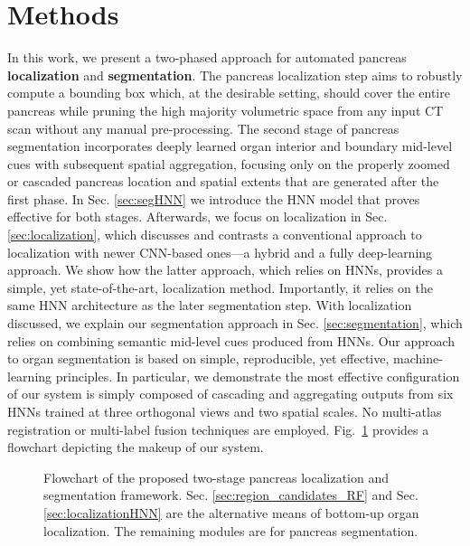 \documentclass[journal]{IEEEtran}
\begin{document}
\section{Methods}\label{sec:methods}
In this work, we present a two-phased approach for automated pancreas \textbf{localization} and \textbf{segmentation}. The pancreas localization step aims to robustly compute a bounding box which, at the desirable setting, should cover the entire pancreas while pruning the high majority volumetric space from any input CT scan without any manual pre-processing. The second stage of pancreas segmentation incorporates deeply learned organ interior and boundary mid-level cues with subsequent spatial aggregation, focusing only on the properly zoomed or cascaded pancreas location and spatial extents that are generated after the first phase. 
In Sec. \ref{sec:segHNN} we introduce the HNN model that proves effective for both stages. Afterwards, we focus on localization in Sec. \ref{sec:localization}, which discusses and contrasts a conventional approach to localization with newer CNN-based ones---a hybrid and a fully deep-learning approach. We show how the latter approach, which relies on HNNs, provides a simple, yet state-of-the-art, localization method. Importantly, it relies on the same HNN architecture as the later segmentation step. With localization discussed, we explain our segmentation approach in Sec. \ref{sec:segmentation}, which relies on combining semantic mid-level cues produced from HNNs. Our approach to organ segmentation is based on simple, reproducible, yet effective, machine-learning principles. In particular, we demonstrate the most effective configuration of our system is simply composed of cascading and aggregating outputs from six HNNs trained at three orthogonal views and two spatial scales. No multi-atlas registration or multi-label fusion techniques are employed. Fig.~\ref{fig:flowchart} provides a flowchart depicting the makeup of our system.
\begin{figure}[htb]\centering	
	\caption{\small Flowchart of the proposed two-stage pancreas localization and segmentation framework. Sec. \ref{sec:region_candidates_RF} and Sec. \ref{sec:localizationHNN} are the alternative means of bottom-up organ localization. The remaining modules are for pancreas segmentation.}
	\label{fig:flowchart}
\end{figure}
\end{document}

